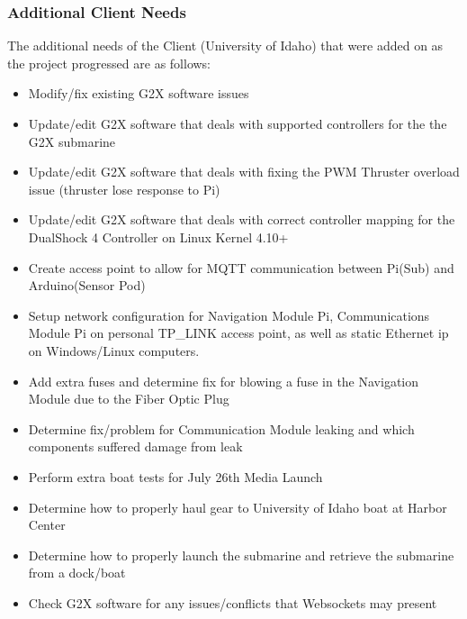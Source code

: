 \documentclass[12pt]{article}
\begin{document}
			\subsubsection{Additional Client Needs}
			The additional needs of the Client (University of Idaho) that were added on as the project progressed are as follows:
			
			\begin{itemize}
				\item Modify/fix existing G2X software issues
				\item Update/edit G2X software that deals with supported controllers for the the G2X submarine
				\item Update/edit G2X software that deals with fixing the PWM Thruster overload issue (thruster lose response to Pi)
				\item Update/edit G2X software that deals with correct controller mapping for the DualShock 4 Controller on Linux Kernel 4.10+
				\item Create access point to allow for MQTT communication between Pi(Sub) and Arduino(Sensor Pod)
				\item Setup network configuration for Navigation Module Pi, Communications Module Pi on personal TP\_LINK access point, as well as static Ethernet ip on Windows/Linux computers.
				\item Add extra fuses and determine fix for blowing a fuse in the Navigation Module due to the Fiber Optic Plug
				\item Determine fix/problem for Communication Module leaking and which components suffered damage from leak
				\item Perform extra boat tests for July 26th Media Launch
				\item Determine how to properly haul gear to University of Idaho boat at Harbor Center
				\item Determine how to properly launch the submarine and retrieve the submarine from a dock/boat
				\item Check G2X software for any issues/conflicts that Websockets may present
			\end{itemize}
	
		\clearpage
	
\end{document}
